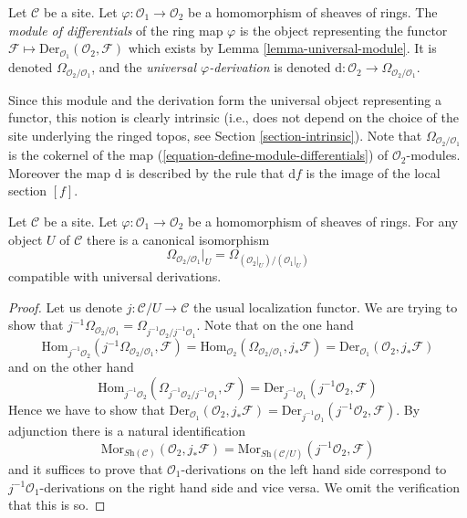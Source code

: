 \begin{definition}
\label{definition-module-differentials}
Let $\mathcal{C}$ be a site. Let $\varphi : \mathcal{O}_1 \to \mathcal{O}_2$
be a homomorphism of sheaves of rings. The {\it module of differentials}
of the ring map $\varphi$ is the object representing the functor
$\mathcal{F} \mapsto \text{Der}_{\mathcal{O}_1}(\mathcal{O}_2, \mathcal{F})$
which exists by Lemma \ref{lemma-universal-module}.
It is denoted $\Omega_{\mathcal{O}_2/\mathcal{O}_1}$, and the {\it universal
$\varphi$-derivation} is denoted
$\text{d} : \mathcal{O}_2 \to \Omega_{\mathcal{O}_2/\mathcal{O}_1}$.
\end{definition}

\noindent
Since this module and the derivation form the universal object representing
a functor, this notion is clearly intrinsic (i.e., does not depend
on the choice of the site underlying the ringed topos, see
Section \ref{section-intrinsic}).
Note that $\Omega_{\mathcal{O}_2/\mathcal{O}_1}$ is the cokernel of
the map (\ref{equation-define-module-differentials}) of
$\mathcal{O}_2$-modules. Moreover the map $\text{d}$ is described
by the rule that $\text{d}f$ is the image of the local section $[f]$.

\begin{lemma}
\label{lemma-localize-differentials}
Let $\mathcal{C}$ be a site. Let $\varphi : \mathcal{O}_1 \to \mathcal{O}_2$
be a homomorphism of sheaves of rings. For any object $U$ of $\mathcal{C}$
there is a canonical isomorphism
$$
\Omega_{\mathcal{O}_2/\mathcal{O}_1}|_U =
\Omega_{(\mathcal{O}_2|_U)/(\mathcal{O}_1|_U)}
$$
compatible with universal derivations.
\end{lemma}

\begin{proof}
Let us denote $j : \mathcal{C}/U \to \mathcal{C}$ the usual localization
functor. We are trying to show that
$j^{-1}\Omega_{\mathcal{O}_2/\mathcal{O}_1} =
\Omega_{j^{-1}\mathcal{O}_2/j^{-1}\mathcal{O}_1}$.
Note that on the one hand
$$
\text{Hom}_{j^{-1}\mathcal{O}_2}
(j^{-1}\Omega_{\mathcal{O}_2/\mathcal{O}_1}, \mathcal{F}) =
\text{Hom}_{\mathcal{O}_2}
(\Omega_{\mathcal{O}_2/\mathcal{O}_1}, j_*\mathcal{F}) =
\text{Der}_{\mathcal{O}_1}(\mathcal{O}_2, j_*\mathcal{F})
$$
and on the other hand
$$
\text{Hom}_{j^{-1}\mathcal{O}_2}
(\Omega_{j^{-1}\mathcal{O}_2/j^{-1}\mathcal{O}_1}, \mathcal{F}) =
\text{Der}_{j^{-1}\mathcal{O}_1}(j^{-1}\mathcal{O}_2, \mathcal{F})
$$
Hence we have to show that
$\text{Der}_{\mathcal{O}_1}(\mathcal{O}_2, j_*\mathcal{F}) =
\text{Der}_{j^{-1}\mathcal{O}_1}(j^{-1}\mathcal{O}_2, \mathcal{F})$.
By adjunction there is a natural identification
$$
\text{Mor}_{\textit{Sh}(\mathcal{C})}(\mathcal{O}_2, j_*\mathcal{F}) =
\text{Mor}_{\textit{Sh}(\mathcal{C}/U)}(j^{-1}\mathcal{O}_2, \mathcal{F})
$$
and it suffices to prove that $\mathcal{O}_1$-derivations on the
left hand side correspond to $j^{-1}\mathcal{O}_1$-derivations on the
right hand side and vice versa. We omit the verification that this is so.
\end{proof}

